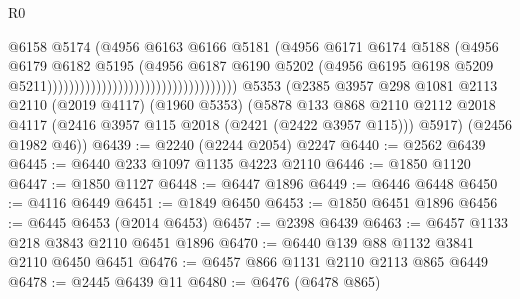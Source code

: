 \begin{lexlean}{R0}
\begin{coremodule}
                                                                @6158
                                                                @5174
                                                                (@4956
                                                                  @6163
                                                                  @6166
                                                                  @5181
                                                                  (@4956
                                                                    @6171
                                                                    @6174
                                                                    @5188
                                                                    (@4956
                                                                      @6179
                                                                      @6182
                                                                      @5195
                                                                      (@4956
                                                                        @6187
                                                                        @6190
                                                                        @5202
                                                                        (@4956
                                                                          @6195
                                                                          @6198
                                                                          @5209
                                                                          @5211)))))))))))))))))))))))))))))))))))
    @5353
    (@2385
      @3957
      @298
      @1081
      @2113
      @2110
      (@2019 @4117)
      (@1960 @5353)
      (@5878
        @133
        @868
        @2110
        @2112
        @2018
        @4117
        (@2416 @3957 @115 @2018 (@2421 (@2422 @3957 @115)))
        @5917)
      (@2456 @1982 @46))
@6439 := @2240 (@2244 @2054) @2247
@6440 := @2562 @6439
@6445 := @6440 @233 @1097 @1135 @4223 @2110
@6446 := @1850 @1120
@6447 := @1850 @1127
@6448 := @6447 @1896
@6449 := @6446 @6448
@6450 := @4116 @6449
@6451 := @1849 @6450
@6453 := @1850 @6451 @1896
@6456 := @6445 @6453 (@2014 @6453)
@6457 := @2398 @6439
@6463 := @6457 @1133 @218 @3843 @2110 @6451 @1896
@6470 := @6440 @139 @88 @1132 @3841 @2110 @6450 @6451
@6476 := @6457 @866 @1131 @2110 @2113 @865 @6449
@6478 := @2445 @6439 @11
@6480 := @6476 (@6478 @865)

\end{coremodule}
\end{lexlean}
